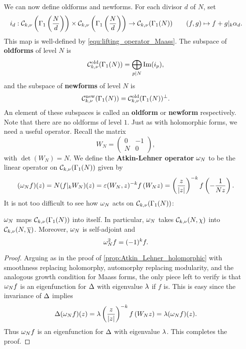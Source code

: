     We can now define oldforms and newforms. For each divisor $d$ of $N$, set
    \[
      i_{d}:\mathcal{C}_{k,\nu}\left(\Gamma_{1}\left(\frac{N}{d}\right)\right)\times\mathcal{C}_{k,\nu}\left(\Gamma_{1}\left(\frac{N}{d}\right)\right) \to \mathcal{C}_{k,\nu}(\Gamma_{1}(N)) \qquad (f,g) \mapsto f+g|_{k}\alpha_{d}.
    \]
    This map is well-defined by \cref{equ:lifting_operator_Maass}. The subspace of \textbf{oldforms} of level $N$ is
    \[
      \mathcal{C}_{k,\nu}^{\mathrm{old}}(\Gamma_{1}(N)) = \bigoplus_{p \mid N}\mathrm{Im}(i_{p}),
    \]
    and the subspace of \textbf{newforms} of level $N$ is
    \[
      \mathcal{C}_{k,\nu}^{\mathrm{new}}(\Gamma_{1}(N)) = \mathcal{C}_{k,\nu}^{\mathrm{old}}(\Gamma_{1}(N))^{\perp}.
    \]
    An element of these subspaces is called an \textbf{oldform} or \textbf{newform} respectively. Note that there are no oldforms of level $1$. Just as with holomorphic forms, we need a useful operator. Recall the matrix
    \[
      W_{N} = \begin{pmatrix} 0 & -1 \\ N & 0 \end{pmatrix},
    \]
    with $\det(W_{N}) = N$. We define the \textbf{Atkin-Lehner operator} $\omega_{N}$ to be the linear operator on $\mathcal{C}_{k,\nu}(\Gamma_{1}(N))$ given by
    \[
      (\omega_{N}f)(z) = N(f|_{k}W_{N})(z) = \varepsilon(W_{N},z)^{-k}f\left(W_{N}z\right) = \left(\frac{z}{|z|}\right)^{-k}f\left(-\frac{1}{Nz}\right).
    \]
    It is not too difficult to see how $\omega_{N}$ acts on $\mathcal{C}_{k,\nu}(\Gamma_{1}(N))$:

    \begin{proposition}\label{prop:Atkin_Lehner_Maass}
      $\omega_{N}$ maps $\mathcal{C}_{k,\nu}(\Gamma_{1}(N))$ into itself. In particular, $\omega_{N}$ takes $\mathcal{C}_{k,\nu}(N,\chi)$ into $\mathcal{C}_{k,\nu}(N,\overline{\chi})$. Moreover, $\omega_{N}$ is self-adjoint and
      \[
        \omega_{N}^{2}f = (-1)^{k}f.
      \]
    \end{proposition}
    \begin{proof}
      Arguing as in the proof of \cref{prop:Atkin_Lehner_holomorphic} with smoothness replacing holomorphy, automorphy replacing modularity, and the analogous growth condition for Maass forms, the only piece left to verify is that $\omega_{N}f$ is an eigenfunction for $\Delta$ with eigenvalue $\lambda$ if $f$ is. This is easy since the invariance of $\Delta$ implies
      \[
        \Delta(\omega_{N}f)(z) = \lambda \left(\frac{z}{|z|}\right)^{-k}f\left(W_{N}z\right) = \lambda(\omega_{N}f)(z).
      \]
      Thus $\omega_{N}f$ is an eigenfunction for $\Delta$ with eigenvalue $\lambda$. This completes the proof.
    \end{proof}

